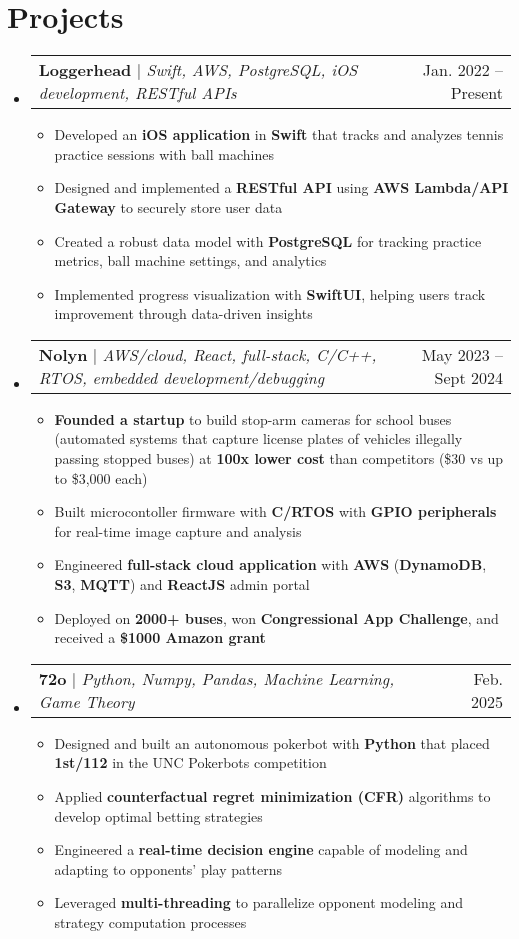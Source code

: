 \documentclass[letterpaper,11pt]{article}
\makeatletter
\newcommand{\resumeItem}[1]{
  \item\small{
    {#1 \vspace{-2pt}}}
}
\newcommand{\resumeProjectHeading}[2]{
    \item
    \begin{tabular*}{0.97\textwidth}{l@{\extracolsep{\fill}}r}
      \small#1 & #2 \\
    \end{tabular*}\vspace{-7pt}
}
\newcommand{\resumeSubHeadingListStart}{\begin{itemize}[leftmargin=0.15in, label={}]}
\newcommand{\resumeSubHeadingListEnd}{\end{itemize}}
\newcommand{\resumeItemListStart}{\begin{itemize}}
\newcommand{\resumeItemListEnd}{\end{itemize}\vspace{-5pt}}
\makeatother
\begin{document}
\section{Projects}
    \resumeSubHeadingListStart
      \resumeProjectHeading
      {\textbf{Loggerhead} $|$ \emph{Swift, AWS, PostgreSQL, iOS development, RESTful APIs}}{Jan. 2022 -- Present}
        \resumeItemListStart
          \resumeItem{Developed an \textbf{iOS application} in \textbf{Swift} that tracks and analyzes tennis practice sessions with ball machines}
          \resumeItem{Designed and implemented a \textbf{RESTful API} using \textbf{AWS Lambda/API Gateway} to securely store user data}
          \resumeItem{Created a robust data model with \textbf{PostgreSQL} for tracking practice metrics, ball machine settings, and analytics}
          \resumeItem{Implemented progress visualization with \textbf{SwiftUI}, helping users track improvement through data-driven insights}
      \resumeItemListEnd
      \resumeProjectHeading
          {\textbf{Nolyn} $|$ \emph{AWS/cloud, React, full-stack, C/C++, RTOS, embedded development/debugging}}{May 2023 -- Sept 2024}
          \resumeItemListStart
            \resumeItem{\textbf{Founded a startup} to build stop-arm cameras for school buses (automated systems that capture license plates of vehicles illegally passing stopped buses) at \textbf{100x lower cost} than competitors (\$30 vs up to \$3,000 each)}
            \resumeItem{Built microcontoller firmware with \textbf{C/RTOS} with \textbf{GPIO peripherals} for real-time image capture and analysis}
            \resumeItem{Engineered \textbf{full-stack cloud application} with \textbf{AWS} (\textbf{DynamoDB}, \textbf{S3}, \textbf{MQTT}) and \textbf{ReactJS} admin portal}
            \resumeItem{Deployed on \textbf{2000+ buses}, won \textbf{Congressional App Challenge}, and received a \textbf{\$1000 Amazon grant}}
          \resumeItemListEnd
      \vspace{-4pt}
        \vspace{-4pt}
        \resumeProjectHeading
          {\textbf{72o} $|$ \emph{Python, Numpy, Pandas, Machine Learning, Game Theory}}{Feb. 2025}
          \resumeItemListStart
            \resumeItem{Designed and built an autonomous pokerbot with \textbf{Python} that placed \textbf{1st/112} in the UNC Pokerbots competition}
            \resumeItem{Applied \textbf{counterfactual regret minimization (CFR)} algorithms to develop optimal betting strategies}
            \resumeItem{Engineered a \textbf{real-time decision engine} capable of modeling and adapting to opponents' play patterns}
            \resumeItem{Leveraged \textbf{multi-threading} to parallelize opponent modeling and strategy computation processes}
          \resumeItemListEnd
    \resumeSubHeadingListEnd
\end{document}
